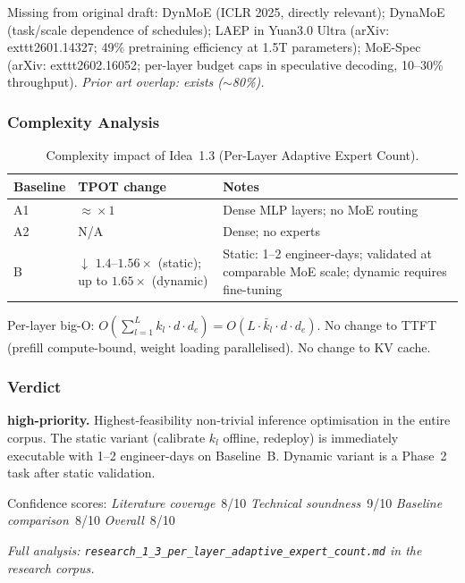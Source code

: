 \documentclass[11pt]{article}
\begin{document}
\noindent
Missing from original draft: DynMoE \cite{GuoChengEtAl2024} (ICLR 2025, directly relevant); DynaMoE \cite{Gulmez2026} (task/scale dependence of schedules); LAEP in Yuan3.0 Ultra \cite{WuEtAl2026} (arXiv:	exttt{2601.14327}; 49\% pretraining efficiency at 1.5T parameters); MoE-Spec \cite{McDanelEtAl2026} (arXiv:	exttt{2602.16052}; per-layer budget caps in speculative decoding, 10--30\% throughput).
\emph{Prior art overlap: exists ($\sim$80\%).}

\subsubsection*{Complexity Analysis}

\begin{table}[h]
\centering
\caption{Complexity impact of Idea~1.3 (Per-Layer Adaptive Expert Count).}
\label{tab:complexity-1-3}
\begin{tabular}{llp{7cm}}
\toprule
\textbf{Baseline} & \textbf{TPOT change} & \textbf{Notes} \\
\midrule
A1 & $\approx\!\times 1$ & Dense MLP layers; no MoE routing \\
A2 & N/A & Dense; no experts \\
B  & $\downarrow$ $1.4$--$1.56\times$ (static); up to $1.65\times$ (dynamic) & Static: 1--2 engineer-days; validated at comparable MoE scale; dynamic requires fine-tuning \\
\bottomrule
\end{tabular}
\end{table}

\noindent
Per-layer big-O: $O\!\left(\sum_{l=1}^{L} k_l \cdot d \cdot d_e\right) = O\!\left(L \cdot \bar{k}_l \cdot d \cdot d_e\right)$.
No change to TTFT (prefill compute-bound, weight loading parallelised).
No change to KV cache.

\subsubsection*{Verdict}
\textbf{high-priority.}
Highest-feasibility non-trivial inference optimisation in the entire corpus.
The static variant (calibrate $k_l$ offline, redeploy) is immediately executable with 1--2 engineer-days on Baseline~B.
Dynamic variant is a Phase~2 task after static validation.

\noindent
Confidence scores:
\emph{Literature coverage}~8/10 \quad
\emph{Technical soundness}~9/10 \quad
\emph{Baseline comparison}~8/10 \quad
\emph{Overall}~8/10
\par\noindent\textit{Full analysis: \texttt{research\_1\_3\_per\_layer\_adaptive\_expert\_count.md} in the research corpus.}
\end{document}
